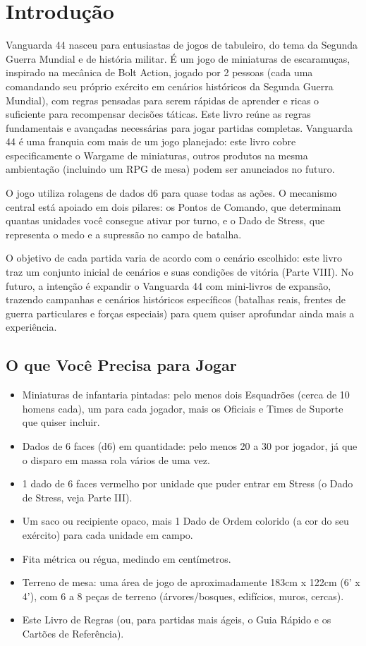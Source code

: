 \clearpage
\section*{Introdução}

Vanguarda 44 nasceu para entusiastas de jogos de tabuleiro, do tema da Segunda Guerra Mundial e de história militar. É um jogo de miniaturas de escaramuças, inspirado na mecânica de Bolt Action, jogado por 2 pessoas (cada uma comandando seu próprio exército em cenários históricos da Segunda Guerra Mundial), com regras pensadas para serem rápidas de aprender e ricas o suficiente para recompensar decisões táticas. Este livro reúne as regras fundamentais e avançadas necessárias para jogar partidas completas. Vanguarda 44 é uma franquia com mais de um jogo planejado: este livro cobre especificamente o Wargame de miniaturas, outros produtos na mesma ambientação (incluindo um RPG de mesa) podem ser anunciados no futuro.

O jogo utiliza rolagens de dados d6 para quase todas as ações. O mecanismo central está apoiado em dois pilares: os Pontos de Comando, que determinam quantas unidades você consegue ativar por turno, e o Dado de Stress, que representa o medo e a supressão no campo de batalha.

O objetivo de cada partida varia de acordo com o cenário escolhido: este livro traz um conjunto inicial de cenários e suas condições de vitória (Parte VIII). No futuro, a intenção é expandir o Vanguarda 44 com mini-livros de expansão, trazendo campanhas e cenários históricos específicos (batalhas reais, frentes de guerra particulares e forças especiais) para quem quiser aprofundar ainda mais a experiência.

\subsection*{O que Você Precisa para Jogar}

\begin{itemize}[leftmargin=1.2cm]
  \item Miniaturas de infantaria pintadas: pelo menos dois Esquadrões (cerca de 10 homens cada), um para cada jogador, mais os Oficiais e Times de Suporte que quiser incluir.
  \item Dados de 6 faces (d6) em quantidade: pelo menos 20 a 30 por jogador, já que o disparo em massa rola vários de uma vez.
  \item 1 dado de 6 faces vermelho por unidade que puder entrar em Stress (o Dado de Stress, veja Parte III).
  \item Um saco ou recipiente opaco, mais 1 Dado de Ordem colorido (a cor do seu exército) para cada unidade em campo.
  \item Fita métrica ou régua, medindo em centímetros.
  \item Terreno de mesa: uma área de jogo de aproximadamente 183cm x 122cm (6' x 4'), com 6 a 8 peças de terreno (árvores/bosques, edifícios, muros, cercas).
  \item Este Livro de Regras (ou, para partidas mais ágeis, o Guia Rápido e os Cartões de Referência).
\end{itemize}

